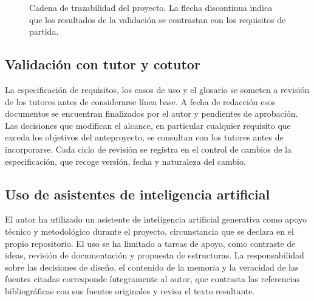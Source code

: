 \begin{figure}[htbp]
  \centering
  \shorthandoff{<>}
  \caption{Cadena de trazabilidad del proyecto. La flecha discontinua indica que los resultados de la validación se contrastan con los requisitos de partida.}
  \label{fig:met-trazabilidad}
\end{figure}

\subsection{Validación con tutor y cotutor}

La especificación de requisitos, los casos de uso y el glosario se someten a revisión de los tutores antes de considerarse línea base. A fecha de redacción esos documentos se encuentran finalizados por el autor y pendientes de aprobación. Las decisiones que modifican el alcance, en particular cualquier requisito que exceda los objetivos del anteproyecto, se consultan con los tutores antes de incorporarse. Cada ciclo de revisión se registra en el control de cambios de la especificación, que recoge versión, fecha y naturaleza del cambio.

\subsection{Uso de asistentes de inteligencia artificial}

El autor ha utilizado un asistente de inteligencia artificial generativa como apoyo técnico y metodológico durante el proyecto, circunstancia que se declara en el propio repositorio. El uso se ha limitado a tareas de apoyo, como contraste de ideas, revisión de documentación y propuesta de estructuras. La responsabilidad sobre las decisiones de diseño, el contenido de la memoria y la veracidad de las fuentes citadas corresponde íntegramente al autor, que contrasta las referencias bibliográficas con sus fuentes originales y revisa el texto resultante.

